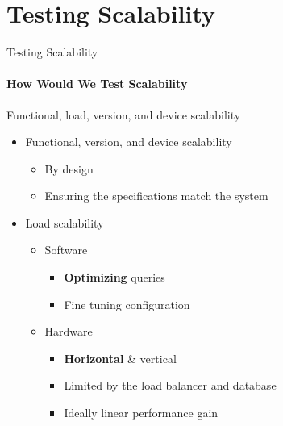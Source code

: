 \section{Testing Scalability}

\begin{frame}{Testing Scalability}
        \framesubtitle{How Would We Test Scalability}
        Functional, load, version, and device scalability
        \begin{itemize}
            \item<1-> Functional, version, and device scalability
                \begin{itemize}
                    \item<1-> By design
                    \item<1-> Ensuring the specifications match the system
                \end{itemize}
            \item<2-> Load scalability
                \begin{itemize}
                    \item<2-> Software
                    \begin{itemize}
                        \item<2-> \textbf{Optimizing} queries
                        \item<2-> Fine tuning configuration
                    \end{itemize}
                    \item<2-> Hardware
                    \begin{itemize}
                        \item<2-> \textbf{Horizontal} \& vertical
                        \item<2-> Limited by the load balancer and database
                        \item<2-> Ideally linear performance gain
                    \end{itemize}
                \end{itemize}
        \end{itemize}
\end{frame}

